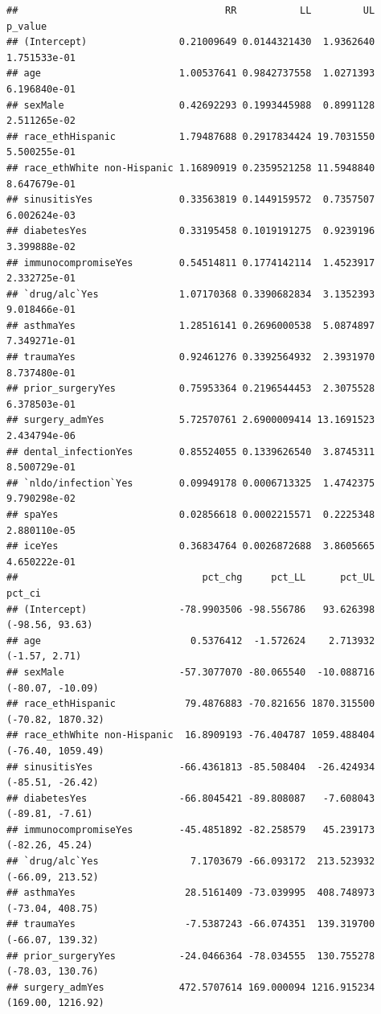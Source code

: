 \documentclass[
]{article}
\begin{document}
\begin{verbatim}
##                                    RR           LL         UL      p_value
## (Intercept)                0.21009649 0.0144321430  1.9362640 1.751533e-01
## age                        1.00537641 0.9842737558  1.0271393 6.196840e-01
## sexMale                    0.42692293 0.1993445988  0.8991128 2.511265e-02
## race_ethHispanic           1.79487688 0.2917834424 19.7031550 5.500255e-01
## race_ethWhite non-Hispanic 1.16890919 0.2359521258 11.5948840 8.647679e-01
## sinusitisYes               0.33563819 0.1449159572  0.7357507 6.002624e-03
## diabetesYes                0.33195458 0.1019191275  0.9239196 3.399888e-02
## immunocompromiseYes        0.54514811 0.1774142114  1.4523917 2.332725e-01
## `drug/alc`Yes              1.07170368 0.3390682834  3.1352393 9.018466e-01
## asthmaYes                  1.28516141 0.2696000538  5.0874897 7.349271e-01
## traumaYes                  0.92461276 0.3392564932  2.3931970 8.737480e-01
## prior_surgeryYes           0.75953364 0.2196544453  2.3075528 6.378503e-01
## surgery_admYes             5.72570761 2.6900009414 13.1691523 2.434794e-06
## dental_infectionYes        0.85524055 0.1339626540  3.8745311 8.500729e-01
## `nldo/infection`Yes        0.09949178 0.0006713325  1.4742375 9.790298e-02
## spaYes                     0.02856618 0.0002215571  0.2225348 2.880110e-05
## iceYes                     0.36834764 0.0026872688  3.8605665 4.650222e-01
##                                pct_chg     pct_LL      pct_UL            pct_ci
## (Intercept)                -78.9903506 -98.556786   93.626398   (-98.56, 93.63)
## age                          0.5376412  -1.572624    2.713932     (-1.57, 2.71)
## sexMale                    -57.3077070 -80.065540  -10.088716  (-80.07, -10.09)
## race_ethHispanic            79.4876883 -70.821656 1870.315500 (-70.82, 1870.32)
## race_ethWhite non-Hispanic  16.8909193 -76.404787 1059.488404 (-76.40, 1059.49)
## sinusitisYes               -66.4361813 -85.508404  -26.424934  (-85.51, -26.42)
## diabetesYes                -66.8045421 -89.808087   -7.608043   (-89.81, -7.61)
## immunocompromiseYes        -45.4851892 -82.258579   45.239173   (-82.26, 45.24)
## `drug/alc`Yes                7.1703679 -66.093172  213.523932  (-66.09, 213.52)
## asthmaYes                   28.5161409 -73.039995  408.748973  (-73.04, 408.75)
## traumaYes                   -7.5387243 -66.074351  139.319700  (-66.07, 139.32)
## prior_surgeryYes           -24.0466364 -78.034555  130.755278  (-78.03, 130.76)
## surgery_admYes             472.5707614 169.000094 1216.915234 (169.00, 1216.92)

\end{verbatim}
\end{document}
